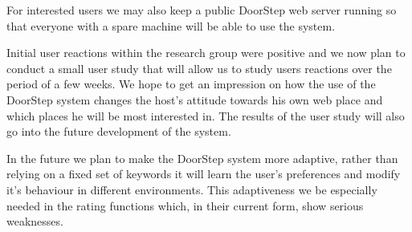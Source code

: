 \documentclass[a4paper]{danarticle}
\theoremstyle{remark}
\begin{document}
    For interested users we may also keep a public DoorStep web server running
    so that everyone with a spare machine will be able to use the system.
    
    Initial user reactions within the research group were positive and we now
    plan to conduct a small user study that will allow us to study users
    reactions over the period of a few weeks. We hope to get an impression on how
    the use of the DoorStep system changes the host's attitude towards his own
    web place and which places he will be most interested in. The results of the
    user study will also go into the future development of the system.
    
    In the future we plan to make the DoorStep system more adaptive,
    rather than relying on a fixed set of keywords it will learn the user's
    preferences and modify it's behaviour in different environments. This
    adaptiveness we be especially needed in the rating functions which, in their
    current form, show serious weaknesses.
    
\end{document}

